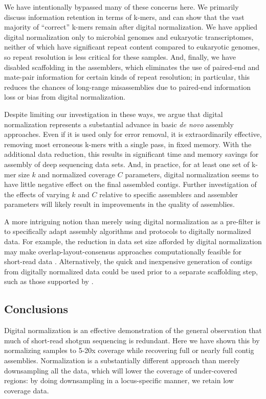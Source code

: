 \documentclass{pnastwo}
\begin{document}
\begin{article}
We have intentionally bypassed many of these concerns here. We
primarily discuss information retention in terms of k-mers, and can
show that the vast majority of ``correct'' k-mers remain after digital
normalization.  We have applied digital normalization only to
microbial genomes and eukaryotic transcriptomes, neither of which have
significant repeat content compared to eukaryotic genomes, so repeat
resolution is less critical for these samples.  And, finally, we have
disabled scaffolding in the assemblers, which eliminates the use of
paired-end and mate-pair information for certain kinds of repeat
resolution; in particular, this reduces the chances of long-range
misassemblies due to paired-end information loss or bias from digital
normalization.

Despite limiting our investigation in these ways, we argue that
digital normalization represents a substantial advance in basic {\em
  de novo} assembly approaches.  Even if it is used only for error
removal, it is extraordinarily effective, removing most erroneous
k-mers with a single pass, in fixed memory.  With the additional data
reduction, this results in significant time and memory savings for
assembly of deep sequencing data sets.  And, in practice, for at least
one set of k-mer size $k$ and normalized coverage $C$ parameters, digital
normalization seems to have little negative effect on the final
assembled contigs.  Further investigation of the effects of varying
$k$ and $C$ relative to specific assemblers and assembler parameters
will likely result in improvements in the quality of assemblies.

A more intriguing notion than merely using digital normalization as a
pre-filter is to specifically adapt assembly algorithms and protocols
to digitally normalized data.  For example, the reduction in data set
size afforded by digital normalization may make
overlap-layout-consensus approaches computationally feasible for
short-read data \cite{pubmed20211242}.  Alternatively, the quick and
inexpensive generation of contigs from digitally normalized data could
be used prior to a separate scaffolding step, such as those supported
by \cite{pubmed20529929,pubmed21926123}.

\subsection{Conclusions}

Digital normalization is an effective demonstration of the general
observation that much of short-read shotgun sequencing is redundant.
Here we have shown this by normalizing samples to 5-20x coverage while
recovering full or nearly full contig assemblies.
Normalization is a substantially different approach than merely
downsampling all the data, which will lower the coverage of
under-covered regions: by doing downsampling in a locus-specific
manner, we retain low coverage data.


\end{article}
\end{document}
